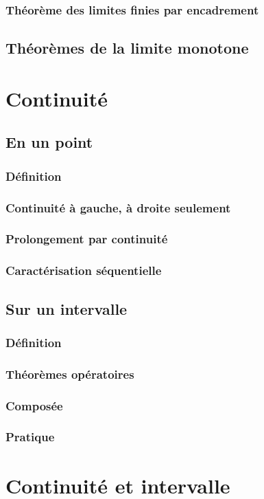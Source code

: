 \documentclass[12pt,a4paper,french]{book}
\begin{document}
			\subsubsection{Théorème des limites finies par encadrement}
		\subsection{Théorèmes de la limite monotone}
	\section{Continuité}
		\subsection{En un point}
			\subsubsection{Définition}
			\subsubsection{Continuité à gauche, à droite seulement}
			\subsubsection{Prolongement par continuité}
			\subsubsection{Caractérisation séquentielle}
		\subsection{Sur un intervalle}
			\subsubsection{Définition}
			\subsubsection{Théorèmes opératoires}
			\subsubsection{Composée}
			\subsubsection{Pratique}
	\section{Continuité et intervalle}
\end{document}
